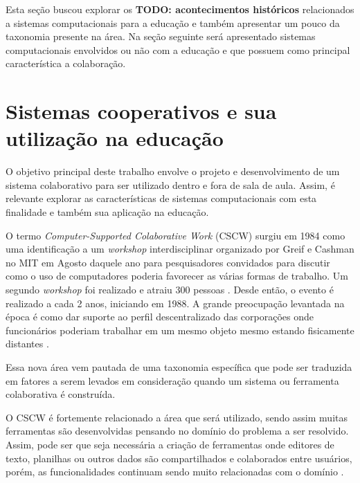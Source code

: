 Esta seção buscou explorar os \textbf{TODO: acontecimentos históricos} relacionados a sistemas computacionais para a educação e também apresentar um pouco da taxonomia presente na área. Na seção seguinte será apresentado sistemas computacionais envolvidos ou não com a educação e que possuem como principal característica a colaboração.



\section{Sistemas cooperativos e sua utilização na educação}


O objetivo principal deste trabalho envolve o projeto e desenvolvimento de um sistema colaborativo para ser utilizado dentro e fora de sala de aula. Assim, é relevante explorar as características de sistemas computacionais com esta finalidade e também sua aplicação na educação.

O termo \emph{Computer-Supported Colaborative Work} (CSCW) surgiu em 1984 como uma identificação a um \emph{workshop} interdisciplinar organizado por Greif e Cashman no MIT em Agosto daquele ano para pesquisadores convidados para discutir como o uso de computadores poderia favorecer as várias formas de trabalho. Um segundo \emph{workshop} foi realizado e atraiu 300 pessoas \cite{greif1988}. Desde então, o evento é realizado a cada 2 anos, iniciando em 1988. A grande preocupação levantada na época é como dar suporte ao perfil descentralizado das corporações onde funcionários poderiam trabalhar em um mesmo objeto mesmo estando fisicamente distantes \cite{reinhard_cscw_1994}.

Essa nova área vem pautada de uma taxonomia específica que pode ser traduzida em fatores a serem levados em consideração quando um sistema ou ferramenta colaborativa é construída.

O CSCW é fortemente relacionado a área que será utilizado, sendo assim muitas ferramentas são desenvolvidas pensando no domínio do problema a ser resolvido. Assim, pode ser que seja necessária a criação de ferramentas onde editores de texto, planilhas ou outros dados são compartilhados e colaborados entre usuários, porém, as funcionalidades continuam sendo muito relacionadas com o domínio \cite{reinhard_cscw_1994}.


